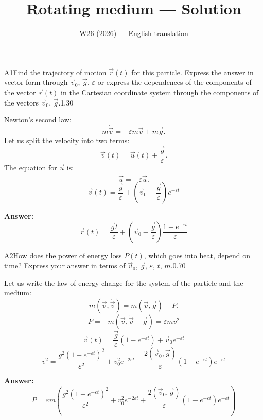 \documentclass[11pt,a4paper]{article}
\title{\textbf{Rotating medium --- Solution}}
\author{\normalsize W26 (2026) — English translation}
\date{}
\begin{document}
\maketitle\vspace{-0.5em}
\begin{solcard}{A1}{Find the trajectory of motion $\vec r (t)$ for this particle. Express the answer in vector form through $\vec{v}_0$, $\vec{g}$, $\varepsilon$ or express the dependences of the components of the vector $\vec{r}(t)$ in the Cartesian coordinate system through the components of the vectors $\vec{v}_0$, $\vec{g}$.}{1.30}

Newton's second law: $$m\dot{\vec v} = -\varepsilon m\vec v + m\vec g.$$Let us split the velocity into two terms: $$\vec v(t) = \vec u(t) + \frac{\vec g}{\varepsilon}.$$The equation for $\vec u$ is: $$\dot{\vec u} = -\varepsilon \vec u.$$$$\vec v(t) = \frac{\vec g}{\varepsilon}+\left(\vec v_0-\frac{\vec g}{\varepsilon}\right) e^{-\varepsilon t}$$

\par\smallskip\noindent\textbf{Answer:} $$\vec r(t) = \frac{\vec g t}{\varepsilon}+\left(\vec v_0-\frac{\vec g}{\varepsilon}\right) \frac{1-e^{-\varepsilon t}}{\varepsilon}$$
\end{solcard}

\begin{solcard}{A2}{How does the power of energy loss $P(t)$, which goes into heat, depend on time? Express your answer in terms of $\vec{v}_0$, $\vec{g}$, $\varepsilon$, $t$, $m$.}{0.70}

Let us write the law of energy change for the system of the particle and the medium: $$m\left(\vec v, \dot{\vec v}\right) = m\left(\vec v, \vec g\right) - P.$$$$P = -m\left(\vec v, \dot{\vec v}-\vec g\right) = \varepsilon m v^2$$$$\vec v(t) = \frac{\vec g}{\varepsilon}\left(1-e^{-\varepsilon t}\right)+\vec v_0 e^{-\varepsilon t}$$$$v^2 = \frac{g^2\left(1-e^{-\varepsilon t}\right)^2}{\varepsilon^2} + v_0^2 e^{-2\varepsilon t}+\frac{2 \left(\vec v_0, \vec g\right)}{\varepsilon}\left(1-e^{-\varepsilon t}\right) e^{-\varepsilon t}$$

\par\smallskip\noindent\textbf{Answer:} $$P = \varepsilon m \left(\frac{g^2\left(1-e^{-\varepsilon t}\right)^2}{\varepsilon^2} + v_0^2 e^{-2\varepsilon t}+\frac{2 \left(\vec v_0, \vec g\right)}{\varepsilon}\left(1-e^{-\varepsilon t}\right) e^{-\varepsilon t}\right)$$
\end{solcard}
\end{document}
